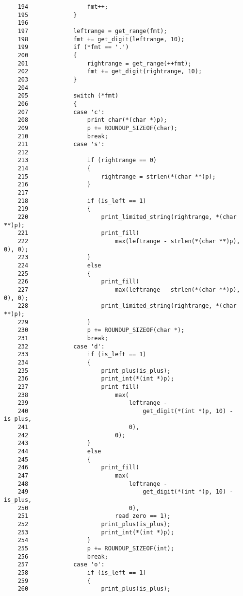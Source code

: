 \documentclass[a4j,11pt]{jarticle}
\begin{document}
\begin{verbatim}
    194	                fmt++;
    195	            }
    196	
    197	            leftrange = get_range(fmt);
    198	            fmt += get_digit(leftrange, 10);
    199	            if (*fmt == '.')
    200	            {
    201	                rightrange = get_range(++fmt);
    202	                fmt += get_digit(rightrange, 10);
    203	            }
    204	
    205	            switch (*fmt)
    206	            {
    207	            case 'c':
    208	                print_char(*(char *)p);
    209	                p += ROUNDUP_SIZEOF(char);
    210	                break;
    211	            case 's':
    212	
    213	                if (rightrange == 0)
    214	                {
    215	                    rightrange = strlen(*(char **)p);
    216	                }
    217	
    218	                if (is_left == 1)
    219	                {
    220	                    print_limited_string(rightrange, *(char **)p);
    221	                    print_fill(
    222	                        max(leftrange - strlen(*(char **)p), 0), 0);
    223	                }
    224	                else
    225	                {
    226	                    print_fill(
    227	                        max(leftrange - strlen(*(char **)p), 0), 0);
    228	                    print_limited_string(rightrange, *(char **)p);
    229	                }
    230	                p += ROUNDUP_SIZEOF(char *);
    231	                break;
    232	            case 'd':
    233	                if (is_left == 1)
    234	                {
    235	                    print_plus(is_plus);
    236	                    print_int(*(int *)p);
    237	                    print_fill(
    238	                        max(
    239	                            leftrange -
    240	                                get_digit(*(int *)p, 10) - is_plus,
    241	                            0),
    242	                        0);
    243	                }
    244	                else
    245	                {
    246	                    print_fill(
    247	                        max(
    248	                            leftrange -
    249	                                get_digit(*(int *)p, 10) - is_plus,
    250	                            0),
    251	                        read_zero == 1);
    252	                    print_plus(is_plus);
    253	                    print_int(*(int *)p);
    254	                }
    255	                p += ROUNDUP_SIZEOF(int);
    256	                break;
    257	            case 'o':
    258	                if (is_left == 1)
    259	                {
    260	                    print_plus(is_plus);

\end{verbatim}
\end{document}
